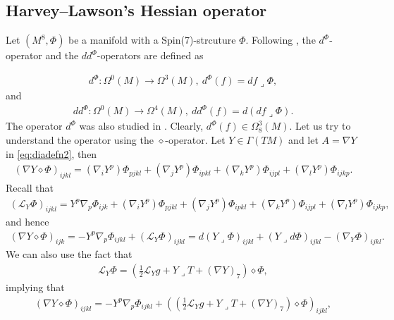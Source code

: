 \documentclass[10pt,a4paper,reqno]{article}
\theoremstyle{definition}
\numberwithin{equation}{section}
\def\del{\nabla}
\def\s7{\Phi}
\def\ddphi{dd^{\Phi}}
\def\dphi{d^{\Phi}}
\def\cL{\mathcal{L}}
\begin{document}





\subsection{Harvey--Lawson's Hessian operator}\label{subsec:harveylawsonop}

Let $(M^8, \Phi)$ be a manifold with a Spin(7)-strcuture $\Phi$. Following \cite{HL-intropotential}, the $\dphi$-operator and the $\ddphi$-operators are defined as 

\begin{align}\label{eq:dphiop}
\dphi: \Omega^0(M) \rightarrow \Omega^3(M),\ \dphi(f) = df\lrcorner \Phi,	
\end{align}
and 
\begin{align}\label{eq:ddphiop}
\ddphi: \Omega^0(M)\rightarrow \Omega^4(M),\ \ddphi(f) = d(df\lrcorner \Phi).
\end{align}
The operator $\dphi$ was also studied in \cite{Verbitsky}. Clearly, $\dphi(f)\in \Omega^3_8(M)$.
Let us  try to understand the operator using the $\diamond$-operator. Let $Y\in \Gamma(TM)$ and let $A=\del Y$ in \cref{eq:diadefn2}, then
 \begin{align*}
 (\del Y \diamond \Phi)_{ijkl}= (\del_iY^p)\Phi_{pjkl}+(\del_jY^p)\Phi_{ipkl}+(\del_kY^p)\Phi_{ijpl}+ (\del_lY^p)\Phi_{ijkp}.
 \end{align*}
Recall that 
\begin{align*}
(\cL_Y \Phi)_{ijkl}= Y^p\del_p\Phi_{ijk}+(\del_iY^p)\Phi_{pjkl}+(\del_jY^p)\s7_{ipkl}+(\del_kY^p)\s7_{ijpl}+(\del_lY^p)\s7_{ijkp},
\end{align*}
and hence
\begin{align*}
(\del Y \diamond \Phi)_{ijk} = -Y^p\del_p\Phi_{ijkl}+(\cL_Y\Phi)_{ijkl} = d(Y\lrcorner \Phi)_{ijkl}+ (Y\lrcorner d\Phi)_{ijkl} - (\del_Y \Phi)_{ijkl}.
\end{align*}
We can also use the fact that 
\begin{align*}
\cL_Y\Phi = \left(\frac 12 \cL_Y g  + Y\lrcorner T + (\del Y)_7\right)\diamond \Phi,
\end{align*}
implying that
\begin{align*}
(\del Y \diamond \Phi)_{ijkl} = -Y^p\del_p\Phi_{ijkl} + \left(\left(\frac 12 \cL_Y g  + Y\lrcorner T + (\del Y)_7\right)\diamond \Phi\right)_{ijkl},
\end{align*}

\medskip
\end{document}
